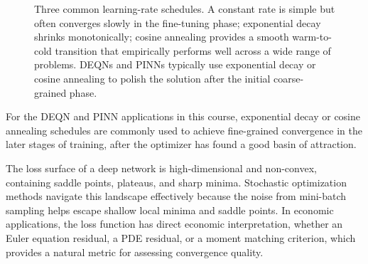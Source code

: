 \documentclass[11pt,a4paper]{report}
\begin{document}
\begin{figure}[ht]
\centering
{}
\caption{Three common learning-rate schedules.  A constant rate is simple but often converges slowly in the fine-tuning phase; exponential decay shrinks monotonically; cosine annealing \citep{loshchilov2017sgdr} provides a smooth warm-to-cold transition that empirically performs well across a wide range of problems.  DEQNs and PINNs typically use exponential decay or cosine annealing to polish the solution after the initial coarse-grained phase.}
\label{fig:lr_schedules}
\end{figure}

For the DEQN and PINN applications in this course, exponential decay or cosine annealing schedules are commonly used to achieve fine-grained convergence in the later stages of training, after the optimizer has found a good basin of attraction.

\begin{keyinsightbox}
The loss surface of a deep network is high-dimensional and non-convex, containing saddle points, plateaus, and sharp minima.  Stochastic optimization methods navigate this landscape effectively because the noise from mini-batch sampling helps escape shallow local minima and saddle points.  In economic applications, the loss function has direct economic interpretation, whether an Euler equation residual, a PDE residual, or a moment matching criterion, which provides a natural metric for assessing convergence quality.
\end{keyinsightbox}
\end{document}
